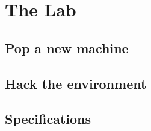 \section{The Lab}


\subsection{Pop a new machine} %


\subsection{Hack the environment} %


\subsection{Specifications} %


